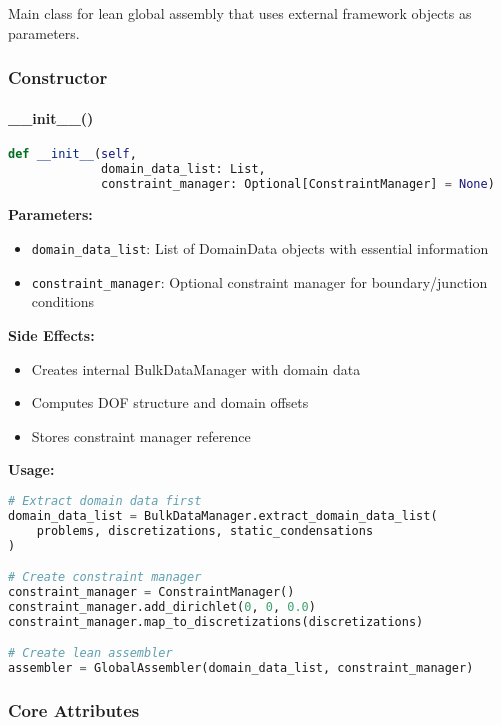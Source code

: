 Main class for lean global assembly that uses external framework objects as parameters.

\subsubsection{Constructor}

\paragraph{\_\_init\_\_()}\leavevmode
\begin{lstlisting}[language=Python, caption=GlobalAssembler Constructor]
def __init__(self, 
             domain_data_list: List,
             constraint_manager: Optional[ConstraintManager] = None)
\end{lstlisting}

\textbf{Parameters:}
\begin{itemize}
    \item \texttt{domain\_data\_list}: List of DomainData objects with essential information
    \item \texttt{constraint\_manager}: Optional constraint manager for boundary/junction conditions
\end{itemize}

\textbf{Side Effects:}
\begin{itemize}
    \item Creates internal BulkDataManager with domain data
    \item Computes DOF structure and domain offsets
    \item Stores constraint manager reference
\end{itemize}

\textbf{Usage:}
\begin{lstlisting}[language=Python, caption=Constructor Usage]
# Extract domain data first
domain_data_list = BulkDataManager.extract_domain_data_list(
    problems, discretizations, static_condensations
)

# Create constraint manager
constraint_manager = ConstraintManager()
constraint_manager.add_dirichlet(0, 0, 0.0)
constraint_manager.map_to_discretizations(discretizations)

# Create lean assembler
assembler = GlobalAssembler(domain_data_list, constraint_manager)
\end{lstlisting}

\subsubsection{Core Attributes}


